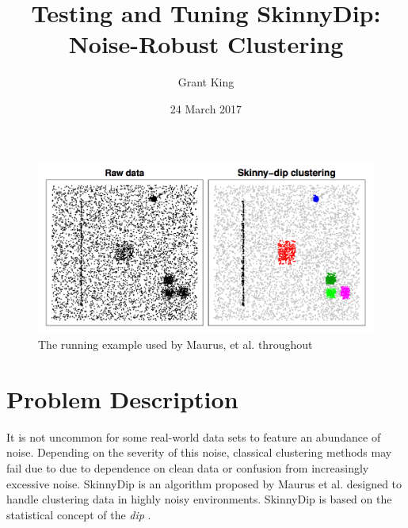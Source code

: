 \documentclass{sig-alternate-05-2015}
\begin{document}


\title{Testing and Tuning SkinnyDip: Noise-Robust Clustering}
\author{
%
%
\alignauthor
Grant King\\
}
\date{24 March 2017}

\maketitle

\begin{figure}[t]
\centering
\includegraphics[width=\textwidth]{images/SkinnyDipExample}
\caption{The running example used by Maurus, et al. throughout \cite{skinnydip}}
\label{fig:sdexample}
\end{figure}

\section{Problem Description}
It is not uncommon for some real-world data sets to feature an abundance of noise. Depending on the severity of this noise, classical clustering methods may fail due to due to dependence on clean data or confusion from increasingly excessive noise. SkinnyDip is an algorithm proposed by Maurus et al.\cite{skinnydip} designed to handle clustering data in highly noisy environments. SkinnyDip is based on the statistical concept of the \textit{dip} \cite{dip}. 
\end{document}
